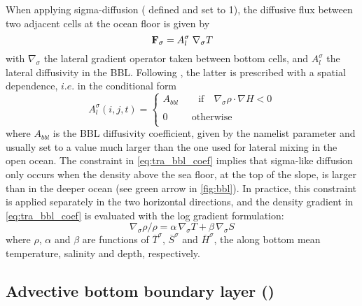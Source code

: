 \documentclass[../tex_main/NEMO_manual]{subfiles}
\begin{document}
When applying sigma-diffusion ( defined and  set to 1),
the diffusive flux between two adjacent cells at the ocean floor is given by 
\begin{equation} \label{eq:tra_bbl_diff}
{\rm {\bf F}}_\sigma=A_l^\sigma \; \nabla_\sigma T
\end{equation} 
with $\nabla_\sigma$ the lateral gradient operator taken between bottom cells,
and  $A_l^\sigma$ the lateral diffusivity in the BBL.
Following \citet{Beckmann_Doscher1997}, the latter is prescribed with a spatial dependence,
$i.e.$ in the conditional form
\begin{equation} \label{eq:tra_bbl_coef}
A_l^\sigma (i,j,t)=\left\{ {\begin{array}{l}
 A_{bbl}  \quad \quad   \mbox{if}  \quad   \nabla_\sigma \rho  \cdot  \nabla H<0 \\ 
 \\
 0\quad \quad \;\,\mbox{otherwise} \\ 
 \end{array}} \right.
\end{equation} 
where $A_{bbl}$ is the BBL diffusivity coefficient, given by the namelist parameter  and
usually set to a value much larger than the one used for lateral mixing in the open ocean.
The constraint in \autoref{eq:tra_bbl_coef} implies that sigma-like diffusion only occurs when
the density above the sea floor, at the top of the slope, is larger than in the deeper ocean
(see green arrow in \autoref{fig:bbl}).
In practice, this constraint is applied separately in the two horizontal directions,
and the density gradient in \autoref{eq:tra_bbl_coef} is evaluated with the log gradient formulation: 
\begin{equation} \label{eq:tra_bbl_Drho}
	\nabla_\sigma \rho / \rho = \alpha \,\nabla_\sigma T + \beta   \,\nabla_\sigma S
\end{equation} 
where $\rho$, $\alpha$ and $\beta$ are functions of $\overline{T}^\sigma$,
$\overline{S}^\sigma$ and $\overline{H}^\sigma$, the along bottom mean temperature, salinity and depth, respectively.

\subsection{Advective bottom boundary layer  (\protect{})}
\label{subsec:TRA_bbl_adv}
\end{document}
